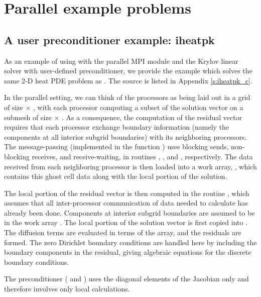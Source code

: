 \section{Parallel example problems}\label{s:ex_parallel}

\subsection{A user preconditioner example: iheatpk}\label{ss:iheatpk}

As an example of using {\ida} with the parallel MPI {\nvecp} module and the Krylov 
linear solver {\idaspgmr} with user-defined preconditioner, we provide the example
 which solves the same 2-D heat PDE problem as . 
The source is listed in Appendix \ref{s:iheatpk_c}.

In the parallel setting, we can think of the processors as being laid out
in a grid of size  $\times$ , with each processor computing
a subset of the solution vector on a submesh of size  $\times$
.  As a consequence, the computation of the residual
vector requires that each processor exchange boundary information
(namely the components at all interior subgrid boundaries) with its
neighboring processors.  The message-passing (implemented in the
function ) uses blocking sends, non-blocking receives, and
receive-waiting, in routines , , and
, respectively.  The data received from each neighboring
processor is then loaded into a work array, , which contains
this ghost cell data along with the local portion of the solution.

The local portion of the residual vector is then computed in the
routine , which assumes that all inter-processor
communication of data needed to calculate  has already been
done.  Components at interior subgrid boundaries are assumed to be in
the work array .  The local portion of the solution vector
 is first copied into .  The diffusion terms are
evaluated in terms of the  array, and the residuals are
formed.  The zero Dirichlet boundary conditions are handled here by
including the boundary components in the residual, giving algebraic
equations for the discrete boundary conditions.

The preconditioner ( and ) uses the diagonal 
elements of the Jacobian only and therefore involves only local calculations.

